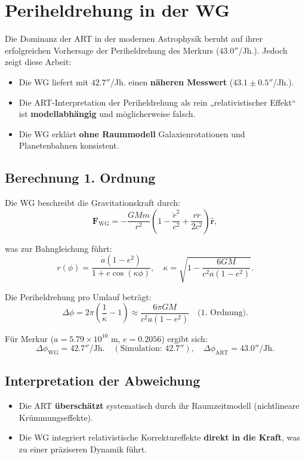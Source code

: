 \section{Periheldrehung in der WG}
Die Dominanz der ART in der modernen Astrophysik beruht auf ihrer erfolgreichen Vorhersage der Periheldrehung des Merkurs ($43.0''$/Jh.). Jedoch zeigt diese Arbeit:
\begin{itemize}
    \item Die WG liefert mit $42.7''$/Jh. einen \textbf{näheren Messwert} ($43.1 \pm 0.5''$/Jh.).
    \item Die ART-Interpretation der Periheldrehung als rein „relativistischer Effekt“ ist \textbf{modellabhängig} und möglicherweise falsch.
    \item Die WG erklärt \textbf{ohne Raummodell} Galaxienrotationen und Planetenbahnen konsistent.
\end{itemize}

\subsection{Berechnung 1. Ordnung}
Die WG beschreibt die Gravitationskraft durch:
\begin{equation}
\mathbf{F}_{\text{WG}} = -\frac{GMm}{r^2}\left(1 - \frac{\dot{r}^2}{c^2} + \frac{r\ddot{r}}{2c^2}\right)\hat{\mathbf{r}},
\end{equation}

was zur Bahngleichung führt:
\begin{equation}
r(\phi) = \frac{a(1-e^2)}{1 + e \cos\left(\kappa \phi\right)}, \quad \kappa = \sqrt{1 - \frac{6GM}{c^2 a (1-e^2)}}.
\end{equation}

Die Periheldrehung pro Umlauf beträgt:
\begin{equation}
\Delta\phi = 2\pi\left(\frac{1}{\kappa} - 1\right) \approx \frac{6\pi GM}{c^2 a (1-e^2)} \quad \text{(1. Ordnung)}.
\end{equation}

Für Merkur ($a = 5.79 \times 10^{10}$ m, $e = 0.2056$) ergibt sich:
\begin{equation}
\Delta\phi_{\text{WG}} = 42.7''/\text{Jh.} \quad (\text{Simulation: } 42.7''), \quad \Delta\phi_{\text{ART}} = 43.0''/\text{Jh.}
\end{equation}

\subsection{Interpretation der Abweichung}
\begin{itemize}
    \item Die ART \textbf{überschätzt} systematisch durch ihr Raumzeitmodell (nichtlineare Krümmungseffekte).
    \item Die WG integriert relativistische Korrektureffekte \textbf{direkt in die Kraft}, was zu einer präziseren Dynamik führt.
\end{itemize}

